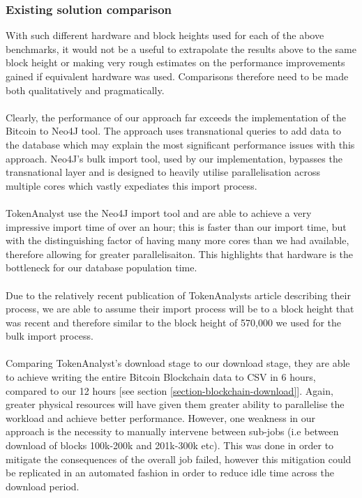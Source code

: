 \subsubsection{Existing solution comparison}
With such different hardware and block heights used for each of the above benchmarks, it would not be a useful to extrapolate the results above to the same block height or making very rough estimates on the performance improvements gained if equivalent hardware was used. Comparisons therefore need to be made both qualitatively and pragmatically. 
\\\\
Clearly, the performance of our approach far exceeds the implementation of the Bitcoin to Neo4J tool. The approach uses transnational queries to add data to the database which may explain the most significant performance issues with this approach. Neo4J's bulk import tool, used by our implementation, bypasses the transnational layer and is designed to heavily utilise parallelisation across multiple cores which vastly expediates this import process. 
\\\\
TokenAnalyst use the Neo4J import tool and are able to achieve a very impressive import time of over an hour; this is faster than our import time, but with the distinguishing factor of having many more cores than we had available, therefore allowing for greater parallelisaiton. This highlights that hardware is the bottleneck for our database population time. 
\\\\
Due to the relatively recent publication of TokenAnalysts article describing their process, we are able to assume their import process will be to a block height that was recent and therefore similar to the block height of 570,000 we used for the bulk import process.
\\\\
Comparing TokenAnalyst's download stage to our download stage, they are able to achieve writing the entire Bitcoin Blockchain data to CSV in 6 hours, compared to our 12 hours [see section \ref{section-blockchain-download}]. Again, greater physical resources will have given them greater ability to parallelise the workload and achieve better performance. However, one weakness in our approach is the necessity to manually intervene between sub-jobs (i.e between download of blocks 100k-200k and 201k-300k etc). This was done in order to mitigate the consequences of the overall job failed, however this mitigation could be replicated in an automated fashion in order to reduce idle time across the download period. 

